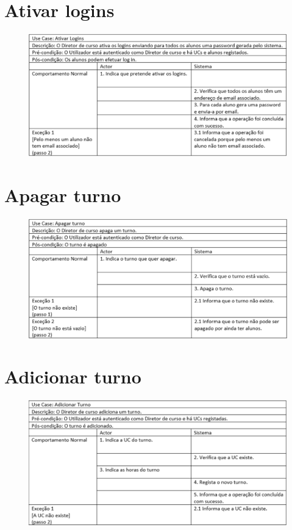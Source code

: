 \documentclass[12pt,a4paper]{report}
\begin{document}
\begin{appendices}
\section{Ativar logins}
\begin{figure}[H]
	\centering 
	\includegraphics[width=\textwidth]{modelacao/especificacao_use_case/ativarlogins.png}  
\end{figure}

\section{Apagar turno}
\begin{figure}[H]
	\centering 
	\includegraphics[width=\textwidth]{modelacao/especificacao_use_case/apagarturno.png}  
\end{figure}

\section{Adicionar turno}
\begin{figure}[H]
	\centering 
	\includegraphics[width=\textwidth]{modelacao/especificacao_use_case/adicionarturno.png}  
\end{figure}


\end{appendices}
\end{document}
